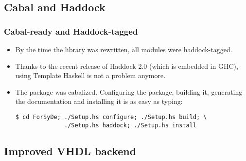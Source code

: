 \documentclass{beamer}
\begin{document}
\subsection{Cabal and Haddock}

\begin{frame}[fragile]
  \frametitle{Cabal-ready and Haddock-tagged}
 \begin{itemize}
 \item<1-> By the time the library was rewritten, all modules were haddock-tagged.
 \item<2-> Thanks to the recent release of Haddock 2.0 (which is embedded in GHC), using Template Haskell is not a problem anymore.
 \item<3-> The package was cabalized. Configuring the package, building it, generating the documentation and installing it is as easy as typing:
   \begin{lstlisting}
$ cd ForSyDe; ./Setup.hs configure; ./Setup.hs build; \
              ./Setup.hs haddock; ./Setup.hs install
   \end{lstlisting}  
 \end{itemize}
\end{frame}

\subsection{Improved VHDL backend}
\end{document}
